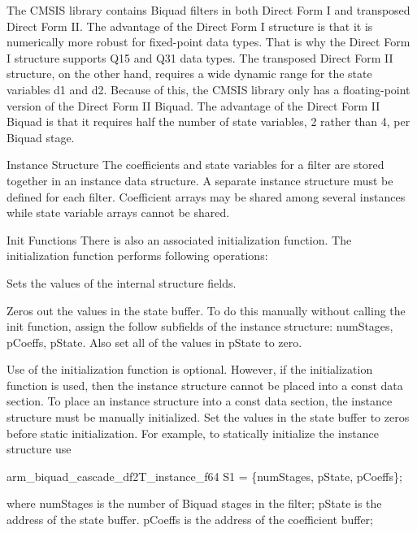 \begin{DoxyParagraph}{}
The C\+M\+S\+IS library contains Biquad filters in both Direct Form I and transposed Direct Form II. The advantage of the Direct Form I structure is that it is numerically more robust for fixed-\/point data types. That is why the Direct Form I structure supports Q15 and Q31 data types. The transposed Direct Form II structure, on the other hand, requires a wide dynamic range for the state variables {\ttfamily d1} and {\ttfamily d2}. Because of this, the C\+M\+S\+IS library only has a floating-\/point version of the Direct Form II Biquad. The advantage of the Direct Form II Biquad is that it requires half the number of state variables, 2 rather than 4, per Biquad stage.
\end{DoxyParagraph}
\begin{DoxyParagraph}{Instance Structure}
The coefficients and state variables for a filter are stored together in an instance data structure. A separate instance structure must be defined for each filter. Coefficient arrays may be shared among several instances while state variable arrays cannot be shared.
\end{DoxyParagraph}
\begin{DoxyParagraph}{Init Functions}
There is also an associated initialization function. The initialization function performs following operations\+:
\begin{DoxyItemize}
\item Sets the values of the internal structure fields.
\item Zeros out the values in the state buffer. To do this manually without calling the init function, assign the follow subfields of the instance structure\+: num\+Stages, p\+Coeffs, p\+State. Also set all of the values in p\+State to zero.
\end{DoxyItemize}
\end{DoxyParagraph}
\begin{DoxyParagraph}{}
Use of the initialization function is optional. However, if the initialization function is used, then the instance structure cannot be placed into a const data section. To place an instance structure into a const data section, the instance structure must be manually initialized. Set the values in the state buffer to zeros before static initialization. For example, to statically initialize the instance structure use 
\begin{DoxyPre}
    arm\_biquad\_cascade\_df2T\_instance\_f64 S1 = \{numStages, pState, pCoeffs\};
\end{DoxyPre}
 where {\ttfamily num\+Stages} is the number of Biquad stages in the filter; {\ttfamily p\+State} is the address of the state buffer. {\ttfamily p\+Coeffs} is the address of the coefficient buffer; 
\end{DoxyParagraph}


